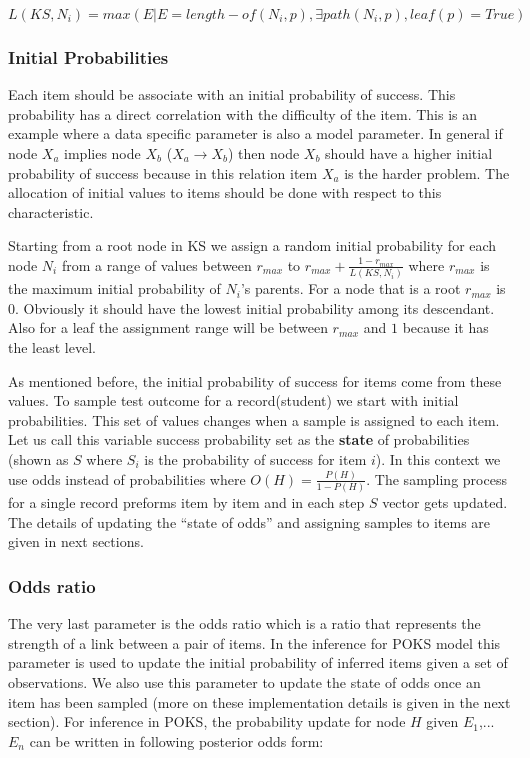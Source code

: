 \begin{equation}
L(KS,N_{i}) = max(E|E=length-of(N_{i},p)  ,  \exists path(N_{i},p)  , leaf(p)=True)
\label{EQ:Level}
\end{equation}

\subsubsection{Initial Probabilities}

Each item should be associate with an initial probability of success. This probability has a direct correlation with the difficulty of the item. This is an example where a data specific parameter is also a model parameter. In general if node $X_a$ implies node $X_b$ ($X_a \rightarrow X_b$) then node $X_b$ should have a higher initial probability of success because in this relation item $X_a$ is the harder problem. The allocation of initial values to items should be done with respect to this characteristic. 

Starting from a root node in KS we assign a random initial probability for each node $N_{i}$ from a range of values between $r_{max}$ to $r_{max}+\frac{1-r_{max}}{L(KS,N_{i})}$ where $r_{max}$ is the maximum initial probability of $N_{i}$'s parents. For a node that is a root $r_{max}$ is $0$. Obviously it should have the lowest initial probability among its descendant. Also for a leaf the assignment range will be between $r_{max}$ and $1$ because it has the least level. 


As mentioned before, the initial probability of success for items come from these values. To sample test outcome for a record(student) we start with initial probabilities. This set of values changes when a sample is assigned to each item. Let us call this variable success probability set as the \textbf{state} of probabilities (shown as $S$ where $S_i$ is the probability of success for item $i$). In this context we use odds instead of probabilities where $O(H) = \frac{P(H)}{1-P(H)}$. The sampling process for a single record preforms item by item and in each step $S$ vector gets updated. The details of updating the ``state of odds'' and assigning samples to items are given in next sections.

\subsubsection{Odds ratio}

The very last parameter is the odds ratio which is a ratio that represents the strength of a link between a pair of items. In the inference for POKS model this parameter is used to update the initial probability of inferred items given a set of observations. We also use this parameter to update the state of odds once an item has been sampled (more on these implementation details is given in the next section).
For inference in POKS, the probability update for node $H$ given $E_1$,... $E_n$ can be written in following posterior odds form:

